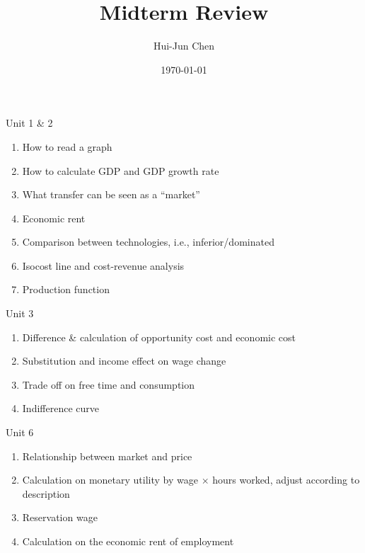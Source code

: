\documentclass{beamer}
\title{Midterm Review}
\author{Hui-Jun Chen}
\institute{The Ohio State University}
\date{\today}
\begin{document}
\maketitle



\begin{frame}{Unit 1 \& 2}
\label{slide:Unit_1}

    \begin{enumerate}
        \item How to read a graph
        \item How to calculate GDP and GDP growth rate
        \item What transfer can be seen as a ``market''
        \item Economic rent
        \item Comparison between technologies, i.e., inferior/dominated
        \item Isocost line and cost-revenue analysis
        \item Production function
    \end{enumerate}

\end{frame}



\begin{frame}{Unit 3}
\label{slide:Unit_3}
    \begin{enumerate}
        \item Difference \& calculation of opportunity cost and economic cost
        \item Substitution and income effect on wage change
        \item Trade off on free time and consumption
        \item Indifference curve
    \end{enumerate}
\end{frame}

\begin{frame}{Unit 6}
\label{slide:Unit_6}
    \begin{enumerate}
        \item Relationship between market and price
        \item Calculation on monetary utility by wage $ \times $ hours worked, adjust according to description
        \item Reservation wage
        \item Calculation on the economic rent of employment
    \end{enumerate}
\end{frame}
\end{document}
